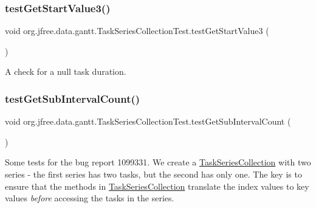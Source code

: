 \subsubsection{\texorpdfstring{test\+Get\+Start\+Value3()}{testGetStartValue3()}}
{\footnotesize\ttfamily void org.\+jfree.\+data.\+gantt.\+Task\+Series\+Collection\+Test.\+test\+Get\+Start\+Value3 (\begin{DoxyParamCaption}{ }\end{DoxyParamCaption})}

A check for a null task duration. \mbox{\label{classorg_1_1jfree_1_1data_1_1gantt_1_1_task_series_collection_test_a7ccd3ebb36a688121cdc24d702b47499}} 
\subsubsection{\texorpdfstring{test\+Get\+Sub\+Interval\+Count()}{testGetSubIntervalCount()}}
{\footnotesize\ttfamily void org.\+jfree.\+data.\+gantt.\+Task\+Series\+Collection\+Test.\+test\+Get\+Sub\+Interval\+Count (\begin{DoxyParamCaption}{ }\end{DoxyParamCaption})}

Some tests for the bug report 1099331. We create a \mbox{\hyperlink{classorg_1_1jfree_1_1data_1_1gantt_1_1_task_series_collection}{Task\+Series\+Collection}} with two series -\/ the first series has two tasks, but the second has only one. The key is to ensure that the methods in \mbox{\hyperlink{classorg_1_1jfree_1_1data_1_1gantt_1_1_task_series_collection}{Task\+Series\+Collection}} translate the index values to key values {\itshape before} accessing the tasks in the series. \mbox{\label{classorg_1_1jfree_1_1data_1_1gantt_1_1_task_series_collection_test_a8018566a65d5f40a28c2c198329aeb47}} 
